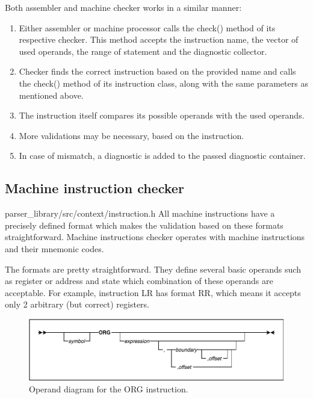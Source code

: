 Both assembler and machine checker works in a similar manner:
\begin{enumerate}
	\item Either assembler or machine processor calls the check() method of its respective checker. This method accepts the instruction name, the vector of used operands, the range of statement and the diagnostic collector.
	\item Checker finds the correct instruction based on the provided name and calls the check() method of its instruction class, along with the same parameters as mentioned above.
	\item The instruction itself compares its possible operands with the used operands.
	\item More validations may be necessary, based on the instruction.
	\item In case of mismatch, a diagnostic is added to the passed diagnostic container.
\end{enumerate}

\subsection{Machine instruction checker}
{parser\_library/src/context/instruction.h}
All machine instructions have a precisely defined format which makes the validation based on these formats straightforward. Machine instructions checker operates with machine instructions and their mnemonic codes.

The formats are pretty straightforward. They define several basic operands such as register or address and state which combination of these operands are acceptable. For example, instruction LR has format RR, which means it accepts only 2 arbitrary (but correct) registers. 

\begin{figure}
	\centering
	\includegraphics[width=\textwidth]{img/org_diagram}
	\caption{Operand diagram for the ORG instruction.}
	
	\label{fig01:check}
\end{figure}

